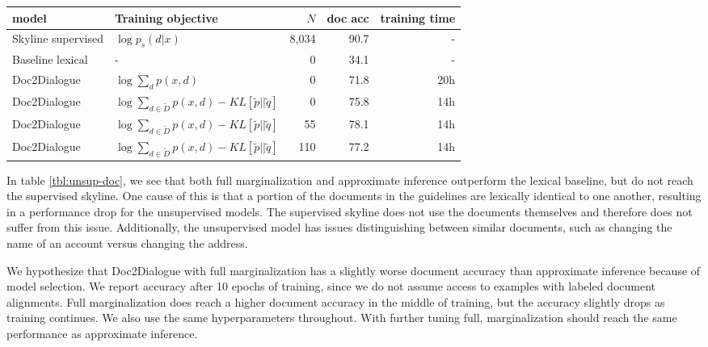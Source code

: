 \documentclass[11pt]{article}
\begin{document}
\begin{table*}
\centering
\begin{tabular}{llrrr}
\toprule
model                             & Training objective     & $N$   & doc acc & training time\\
\midrule
Skyline supervised                & $\log p_s(d|x)$        & 8,034 &    90.7 & -\\
Baseline lexical                  & -                      & 0     &    34.1 & -\\
Doc2Dialogue                      & $\log \sum_dp(x,d)$    & 0     &    71.8 & 20h\\
Doc2Dialogue                      & $\log \sum_{d\in\tilde{D}} p(x,d) - KL[\tilde{p}||\tilde{q}]$ & 0     &    75.8 & 14h\\
Doc2Dialogue                      & $\log \sum_{d\in\tilde{D}} p(x,d) - KL[\tilde{p}||\tilde{q}]$ & 55    &    78.1 & 14h\\
Doc2Dialogue                      & $\log \sum_{d\in\tilde{D}} p(x,d) - KL[\tilde{p}||\tilde{q}]$ & 110   &    77.2 & 14h\\
\bottomrule
\end{tabular}
\caption{
\label{tbl:unsup-doc}
Results for document classification with a generative model at the first
agent action in a conversation. Documents and dialogues are truncated to the first 256
tokens.
The number of labeled training examples is $N$.
The set $\tilde{D}=\text{argtop16}q(d|x)$ is used to approximate the
partition function for $\tilde{p}(d|x)$ and $\tilde{q}(d|x)$.
}
\end{table*}

In table \ref{tbl:unsup-doc}, we see that both full marginalization and approximate inference
outperform the lexical baseline, but do not reach the supervised skyline.
One cause of this is that a portion of the documents in the guidelines are lexically identical to one
another, resulting in a performance drop for the unsupervised models.
The supervised skyline does not use the documents themselves and therefore does not
suffer from this issue.
Additionally, the unsupervised model has issues distinguishing between similar
documents, such as changing the name of an account versus changing the address.

We hypothesize that Doc2Dialogue with full marginalization has a slightly worse document accuracy
than approximate inference because of model selection.
We report accuracy after 10 epochs of training, since we do not assume access to
examples with labeled document alignments.
Full marginalization does reach a higher document accuracy in the middle of training,
but the accuracy slightly drops as training continues.
We also use the same hyperparameters throughout.
With further tuning full, marginalization should reach the same performance as
approximate inference.
\end{document}
